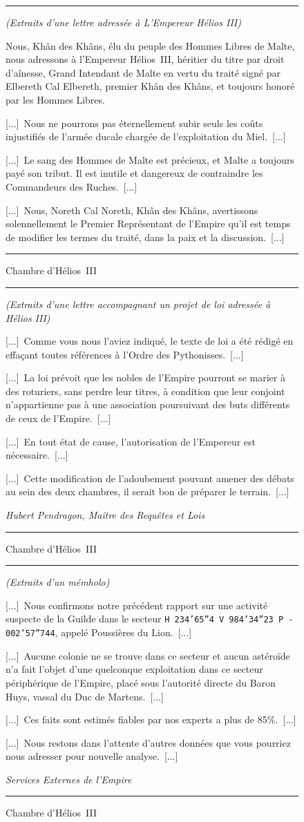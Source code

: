\documentclass{article}
\newcommand{\indice}[4]{
  \begin{figure}[H]
    \begin{center}
      \rule{0.5\textwidth}{1pt}
    \end{center}
    \begin{framed}
      \begin{samepage}
        \textit{#1}
        \nopagebreak

        #2

        \nopagebreak

        \hfill\textit{#3}
      \end{samepage}
    \end{framed}
    \caption{#4}
    \begin{center}
      \rule{0.5\textwidth}{1pt}
    \end{center}
  \end{figure}
}
\begin{document}
\indice
{(Extraits d'une lettre adressée à L'Empereur Hélios III)}
{Nous, Khân des Khâns, élu du peuple des Hommes Libres de Malte, nous adressons
à l'Empereur Hélios~III, héritier du titre par droit d'aînesse, Grand Intendant
de Malte en vertu du traité signé par Elbereth Cal Elbereth, premier Khân des
Khâns, et toujours honoré par les Hommes Libres.

\nobreak

[...]~Nous ne pourrons pas éternellement subir seuls les coûts injustifiés de
l'armée ducale chargée de l'exploitation du Miel.~[...]

\nobreak

[...]~Le sang des Hommes de Malte est précieux, et Malte a toujours payé son
tribut. Il est inutile et dangereux de contraindre les Commandeurs des
Ruches.~[...]

\nobreak

[...]~Nous, Noreth Cal Noreth, Khân des Khâns, avertissons solennellement le
Premier Représentant de l'Empire qu'il est temps de modifier les termes du
traité, dans la paix et la discussion.~[...]}
{}
{Chambre d'Hélios~III}

\indice
{(Extraits d'une lettre accompagnant un projet de loi adressée à Hélios III)}
{[...]~Comme vous nous l'aviez indiqué, le texte de loi a été rédigé en
  effaçant toutes références à l'Ordre des Pythonisses.~[...]

\nobreak

[...]~La loi prévoit que les nobles de l'Empire pourront se marier à des
roturiers, sans perdre leur titres, à condition que leur conjoint
n'appartienne pas à une association poursuivant des buts différents de ceux de
l'Empire.~[...]

\nobreak

[...]~En tout état de cause, l'autorisation de l'Empereur est nécessaire.~[...]

\nobreak

[...]~Cette modification de l'adoubement pouvant amener des débats au sein des
deux chambres, il serait bon de préparer le terrain.~[...]}
{Hubert Pendragon, Maître des Requêtes et Lois}
{Chambre d'Hélios~III}

\indice
{(Extraits d'un mémholo)}
{[...]~Nous confirmons notre précédent rapport sur une activité suspecte de la
Guilde dans le secteur \mbox{\texttt{H 234'65''4 V 984'34''23 P -
002'57''744}}, appelé Poussières du Lion.~[...]

\nobreak

[...]~Aucune colonie ne se trouve dans ce secteur et aucun astéroïde n'a fait
l'objet d'une quelconque exploitation dans ce secteur périphérique de l'Empire,
placé sous l'autorité directe du Baron Huys, vassal du Duc de Martens.~[...]

\nobreak

[...]~Ces faits sont estimés fiables par nos experts a plus de 85\%.~[...]

\nobreak

[...]~Nous restons dans l'attente d'autres données que vous pourriez nous
adresser pour nouvelle analyse.~[...]} 
{Services Externes de l'Empire}
{Chambre d'Hélios~III}
\end{document}
